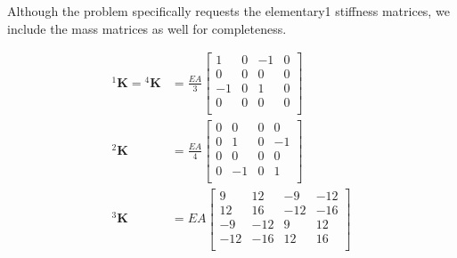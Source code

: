 \documentclass[12pt]{article}
\begin{document}
Although the problem specifically requests the elementary1 stiffness matrices, we include the mass matrices as well for completeness.

\begin{minipage}{0.48\textwidth}
	\begin{align*}
		{}^1\mathbf K ={}^4\mathbf K & =\frac{EA}{3}\begin{bmatrix}
			                                            1  & 0 & -1 & 0 \\
			                                            0  & 0 & 0  & 0 \\
			                                            -1 & 0 & 1  & 0 \\
			                                            0  & 0 & 0  & 0 \\
		                                            \end{bmatrix} \\
		{}^2\mathbf K                & =\frac{EA}{4}\begin{bmatrix}
			                                            0 & 0  & 0 & 0  \\
			                                            0 & 1  & 0 & -1 \\
			                                            0 & 0  & 0 & 0  \\
			                                            0 & -1 & 0 & 1  \\
		                                            \end{bmatrix} \\
		{}^3\mathbf K                & =EA\begin{bmatrix}
			                                  9   & 12  & -9  & -12 \\
			                                  12  & 16  & -12 & -16 \\
			                                  -9  & -12 & 9   & 12  \\
			                                  -12 & -16 & 12  & 16  \\
		                                  \end{bmatrix}
	\end{align*}
\end{minipage}
\hfill
\end{document}
